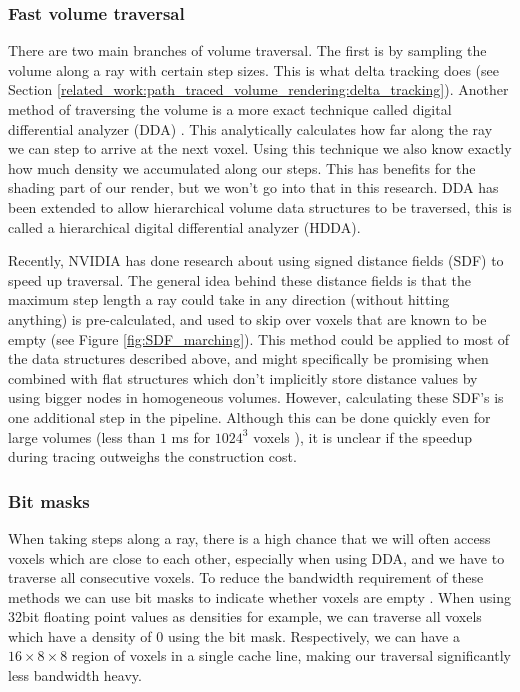 \subsubsection{Fast volume traversal} \label{related_work:attribute_separation:fast_volume_traversal}
There are two main branches of volume traversal. The first is by sampling the volume along a ray with certain step sizes. This is what delta tracking does (see Section \ref{related_work:path_traced_volume_rendering:delta_tracking}). Another method of traversing the volume is a more exact technique called digital differential analyzer (DDA) \cite{amanatides1987fast}. This analytically calculates how far along the ray we can step to arrive at the next voxel. Using this technique we also know exactly how much density we accumulated along our steps. This has benefits for the shading part of our render, but we won't go into that in this research. DDA has been extended to allow hierarchical volume data structures to be traversed, this is called a hierarchical digital differential analyzer (HDDA)\cite{laine2010efficient}.


Recently, NVIDIA has done research about using signed distance fields (SDF) to speed up traversal\cite{soderlund2022ray}. The general idea behind these distance fields is that the maximum step length a ray could take in any direction (without hitting anything) is pre-calculated, and used to skip over voxels that are known to be empty (see Figure \ref{fig:SDF_marching}). This method could be applied to most of the data structures described above, and might specifically be promising when combined with flat structures which don't implicitly store distance values by using bigger nodes in homogeneous volumes. However, calculating these SDF's is one additional step in the pipeline. Although this can be done quickly even for large volumes (less than $1$ ms for $1024^3$ voxels \cite{cao2010parallel}), it is unclear if the speedup during tracing outweighs the construction cost.
\subsubsection{Bit  masks} \label{related_work:attribute_separation:bitmasks}
When taking steps along a ray, there is a high chance that we will often access voxels which are close to each other, especially when using DDA, and we have to traverse all consecutive voxels. To reduce the bandwidth requirement of these methods we can use bit masks to indicate whether voxels are empty \cite{van2015real}\cite{museth2013vdb}. When using 32bit floating point values as densities for example, we can traverse all voxels which have a density of $0$ using the bit mask. Respectively, we can have a $16\times8\times8$ region of voxels in a single cache line, making our traversal significantly less bandwidth heavy.

